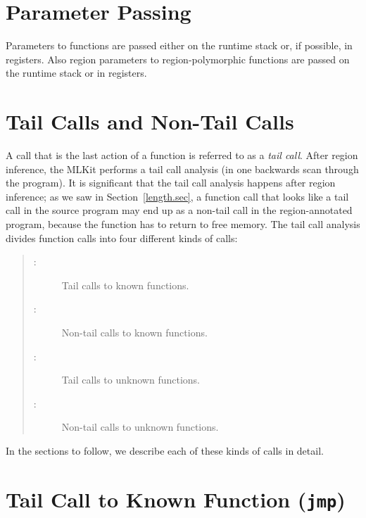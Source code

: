 \documentclass[12pt]{book}
\begin{document}
\section{Parameter Passing}

Parameters to functions are passed either on the runtime
%
%
%
stack or, if possible, in
%
%
%
registers. Also region parameters to region-polymorphic functions are passed on
the runtime stack or in registers.

\section{Tail Calls and Non-Tail Calls}
\label{tailcall.sec}

A call that is the last action of a function is referred to as a {\em tail
  call}. After region inference, the MLKit performs a tail call analysis (in one
backwards scan through the program). It is significant that the tail call
analysis happens after region inference; as we saw in Section~\ref{length.sec},
a function call that looks like a tail call in the source program may end up as
a non-tail call in the region-annotated program, because the function has to
return to free memory. The tail call analysis divides function calls into four
different kinds of calls:
\begin{quote}
\begin{description}
\item[:] Tail calls to known functions.
\item[:] Non-tail calls to known functions.
\item[:] Tail calls to unknown functions.
\item[:] Non-tail calls to unknown functions.
\end{description}
\end{quote}
In the sections to follow, we describe each of these kinds of calls in detail.

\section{Tail Call to Known Function (\texttt{jmp})}
\label{simplejump.sec}
\end{document}
